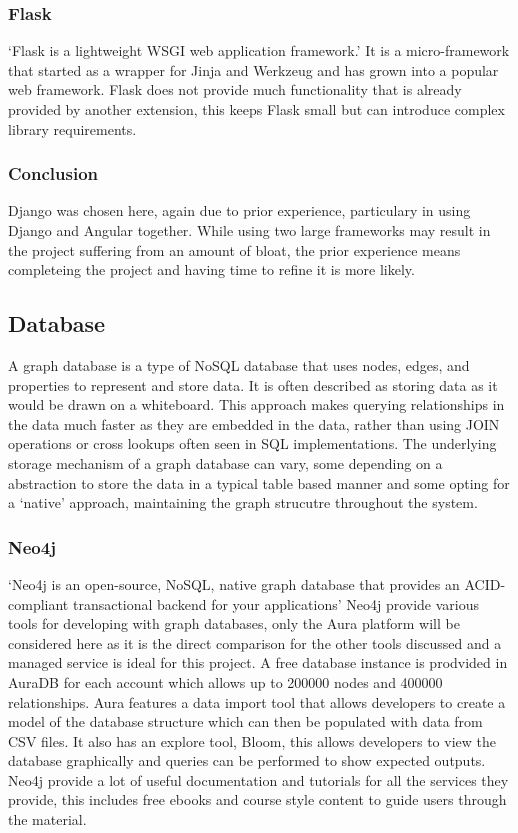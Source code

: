 \subsubsection*{Flask}
`Flask is a lightweight WSGI web application framework.'\cite{ronacherFlaskSimpleFramework} It is a micro-framework that
 started as a wrapper for Jinja and Werkzeug and has grown into a popular web framework. Flask does not provide much 
functionality that is already provided by another extension, this keeps Flask small but can introduce complex library 
requirements. 
\subsubsection*{Conclusion}
Django was chosen here, again due to prior experience, particulary in using Django and Angular together. While using 
two large frameworks may result in the project suffering from an amount of bloat, the prior experience means completeing
 the project and having time to refine it is more likely.
\subsection{Database}
A graph database is a type of NoSQL database that uses nodes, edges, and properties to represent and store data. It is 
often described as storing data as it would be drawn on a whiteboard. This approach makes querying relationships in the 
data much faster as they are embedded in the data, rather than using JOIN operations or cross lookups often seen in SQL 
implementations. The underlying storage mechanism of a graph database can vary, some depending on a abstraction to store
 the data in a typical table based manner and some opting for a `native' approach, maintaining the graph strucutre 
throughout the system.
\subsubsection*{Neo4j}
`Neo4j is an open-source, NoSQL, native graph database that provides an ACID-compliant transactional backend for your 
applications'\cite{WhatGraphDatabaseb} Neo4j provide various tools for developing with graph databases, only the Aura 
platform will be considered here as it is the direct comparison for the other tools discussed and a managed service is 
ideal for this project. A free database instance is prodvided in AuraDB for each account which allows up to 200000 nodes
 and 400000 relationships. Aura features a data import tool that allows developers to create a model of the database 
structure which can then be populated with data from CSV files. It also has an explore tool, Bloom, this allows 
developers to view the database graphically and queries can be performed to show expected outputs. Neo4j provide a lot 
of useful documentation and tutorials for all the services they provide, this includes free ebooks and course style 
content to guide users through the material.
